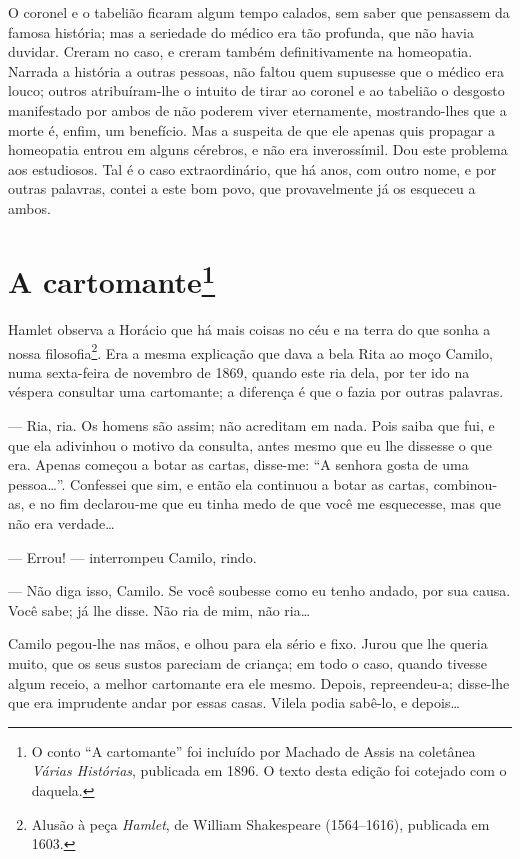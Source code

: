 O coronel e o tabelião ficaram algum tempo calados, sem saber que
pensassem da famosa história; mas a seriedade do médico era tão
profunda, que não havia duvidar. Creram no caso, e creram também
definitivamente na homeopatia. Narrada a história a outras pessoas, não
faltou quem supusesse que o médico era louco; outros atribuíram-lhe o
intuito de tirar ao coronel e ao tabelião o desgosto manifestado por
ambos de não poderem viver eternamente, mostrando-lhes que a morte é,
enfim, um benefício. Mas a suspeita de que ele apenas quis propagar a
homeopatia entrou em alguns cérebros, e não era inverossímil. Dou este
problema aos estudiosos. Tal é o caso extraordinário, que há anos, com
outro nome, e por outras palavras, contei a este bom povo, que
provavelmente já os esqueceu a ambos. 


\chapter{A cartomante\footnote[*]{O conto ``A cartomante'' foi incluído por
  Machado de Assis na coletânea \emph{Várias Histórias}, publicada em
  1896. O texto desta edição foi cotejado com o daquela.}}

Hamlet observa a Horácio que há mais coisas no céu e na terra do que
sonha a nossa filosofia\footnote{Alusão à peça \emph{Hamlet}, de William
  Shakespeare (1564--1616), publicada em 1603.}. Era a mesma explicação
que dava a bela Rita ao moço Camilo, numa sexta-feira de novembro de
1869, quando este ria dela, por ter ido na véspera consultar uma
cartomante; a diferença é que o fazia por outras palavras.

--- Ria, ria. Os homens são assim; não acreditam em nada. Pois saiba que
fui, e que ela adivinhou o motivo da consulta, antes mesmo que eu lhe
dissesse o que era. Apenas começou a botar as cartas, disse-me: ``A
senhora gosta de uma pessoa\ldots{}''. Confessei que sim, e então ela
continuou a botar as cartas, combinou-as, e no fim declarou-me que eu
tinha medo de que você me esquecesse, mas que não era verdade\ldots{}

--- Errou! --- interrompeu Camilo, rindo.

--- Não diga isso, Camilo. Se você soubesse como eu tenho andado, por sua
causa. Você sabe; já lhe disse. Não ria de mim, não ria\ldots{}

Camilo pegou-lhe nas mãos, e olhou para ela sério e fixo. Jurou que lhe
queria muito, que os seus sustos pareciam de criança; em todo o caso,
quando tivesse algum receio, a melhor cartomante era ele mesmo. Depois,
repreendeu-a; disse-lhe que era imprudente andar por essas casas. Vilela
podia sabê-lo, e depois\ldots{}

